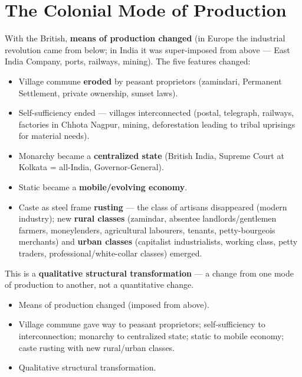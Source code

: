 \section{The Colonial Mode of Production}

With the British, \textbf{means of production changed} (in Europe the industrial revolution came from below; in India it was super-imposed from above --- East India Company, ports, railways, mining). The five features changed:
\begin{itemize}
\item Village commune \textbf{eroded} by peasant proprietors (zamindari, Permanent Settlement, private ownership, sunset laws).
\item Self-sufficiency ended --- villages interconnected (postal, telegraph, railways, factories in Chhota Nagpur, mining, deforestation leading to tribal uprisings for material needs).
\item Monarchy became a \textbf{centralized state} (British India, Supreme Court at Kolkata = all-India, Governor-General).
\item Static became a \textbf{mobile/evolving economy}.
\item Caste as steel frame \textbf{rusting} --- the class of artisans disappeared (modern industry); new \textbf{rural classes} (zamindar, absentee landlords/gentlemen farmers, moneylenders, agricultural labourers, tenants, petty-bourgeois merchants) and \textbf{urban classes} (capitalist industrialists, working class, petty traders, professional/white-collar classes) emerged.
\end{itemize}

\begin{KeyConcept}
This is a \textbf{qualitative structural transformation} --- a change from one mode of production to another, not a quantitative change.
\end{KeyConcept}

\begin{QuickRevision}
\begin{itemize}
\item Means of production changed (imposed from above).
\item Village commune gave way to peasant proprietors; self-sufficiency to interconnection; monarchy to centralized state; static to mobile economy; caste rusting with new rural/urban classes.
\item Qualitative structural transformation.
\end{itemize}
\end{QuickRevision}

